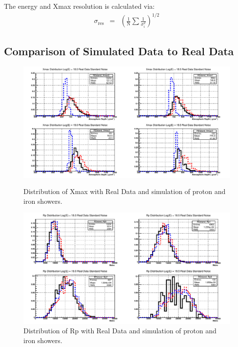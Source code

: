 
The energy and Xmax resolution is calculated via:
\begin{eqnarray}
\sigma_{\mathrm{res}} &=& \left( \frac{1}{\mathrm{N}} \sum \frac{1}{\sigma^2_i} \right)^{1/2}
\end{eqnarray}

\subsection{Comparison of Simulated Data to Real Data}
\begin{figure}
\centering
\includegraphics[width=\textwidth]{chapters/graphs/SelectionEff/RealDataAndSim_XmaxDistComp.pdf}
\caption{Distribution of Xmax with Real Data and simulation of proton and iron showers.}
\vspace{3mm}
\includegraphics[width=\textwidth]{chapters/graphs/SelectionEff/RealDataAndSim_RpDistComp.pdf}
\caption{Distribution of Rp with Real Data and simulation of proton and iron showers.}
\end{figure}

